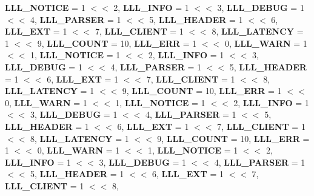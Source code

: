 \begin{DoxyCompactItemize}
{\bfseries L\+L\+L\+\_\+\+N\+O\+T\+I\+CE} = 1 $<$$<$ 2, 
{\bfseries L\+L\+L\+\_\+\+I\+N\+FO} = 1 $<$$<$ 3, 
\newline
{\bfseries L\+L\+L\+\_\+\+D\+E\+B\+UG} = 1 $<$$<$ 4, 
{\bfseries L\+L\+L\+\_\+\+P\+A\+R\+S\+ER} = 1 $<$$<$ 5, 
{\bfseries L\+L\+L\+\_\+\+H\+E\+A\+D\+ER} = 1 $<$$<$ 6, 
{\bfseries L\+L\+L\+\_\+\+E\+XT} = 1 $<$$<$ 7, 
\newline
{\bfseries L\+L\+L\+\_\+\+C\+L\+I\+E\+NT} = 1 $<$$<$ 8, 
{\bfseries L\+L\+L\+\_\+\+L\+A\+T\+E\+N\+CY} = 1 $<$$<$ 9, 
{\bfseries L\+L\+L\+\_\+\+C\+O\+U\+NT} = 10, 
{\bfseries L\+L\+L\+\_\+\+E\+RR} = 1 $<$$<$ 0, 
\newline
{\bfseries L\+L\+L\+\_\+\+W\+A\+RN} = 1 $<$$<$ 1, 
{\bfseries L\+L\+L\+\_\+\+N\+O\+T\+I\+CE} = 1 $<$$<$ 2, 
{\bfseries L\+L\+L\+\_\+\+I\+N\+FO} = 1 $<$$<$ 3, 
{\bfseries L\+L\+L\+\_\+\+D\+E\+B\+UG} = 1 $<$$<$ 4, 
\newline
{\bfseries L\+L\+L\+\_\+\+P\+A\+R\+S\+ER} = 1 $<$$<$ 5, 
{\bfseries L\+L\+L\+\_\+\+H\+E\+A\+D\+ER} = 1 $<$$<$ 6, 
{\bfseries L\+L\+L\+\_\+\+E\+XT} = 1 $<$$<$ 7, 
{\bfseries L\+L\+L\+\_\+\+C\+L\+I\+E\+NT} = 1 $<$$<$ 8, 
\newline
{\bfseries L\+L\+L\+\_\+\+L\+A\+T\+E\+N\+CY} = 1 $<$$<$ 9, 
{\bfseries L\+L\+L\+\_\+\+C\+O\+U\+NT} = 10, 
{\bfseries L\+L\+L\+\_\+\+E\+RR} = 1 $<$$<$ 0, 
{\bfseries L\+L\+L\+\_\+\+W\+A\+RN} = 1 $<$$<$ 1, 
\newline
{\bfseries L\+L\+L\+\_\+\+N\+O\+T\+I\+CE} = 1 $<$$<$ 2, 
{\bfseries L\+L\+L\+\_\+\+I\+N\+FO} = 1 $<$$<$ 3, 
{\bfseries L\+L\+L\+\_\+\+D\+E\+B\+UG} = 1 $<$$<$ 4, 
{\bfseries L\+L\+L\+\_\+\+P\+A\+R\+S\+ER} = 1 $<$$<$ 5, 
\newline
{\bfseries L\+L\+L\+\_\+\+H\+E\+A\+D\+ER} = 1 $<$$<$ 6, 
{\bfseries L\+L\+L\+\_\+\+E\+XT} = 1 $<$$<$ 7, 
{\bfseries L\+L\+L\+\_\+\+C\+L\+I\+E\+NT} = 1 $<$$<$ 8, 
{\bfseries L\+L\+L\+\_\+\+L\+A\+T\+E\+N\+CY} = 1 $<$$<$ 9, 
\newline
{\bfseries L\+L\+L\+\_\+\+C\+O\+U\+NT} = 10, 
{\bfseries L\+L\+L\+\_\+\+E\+RR} = 1 $<$$<$ 0, 
{\bfseries L\+L\+L\+\_\+\+W\+A\+RN} = 1 $<$$<$ 1, 
{\bfseries L\+L\+L\+\_\+\+N\+O\+T\+I\+CE} = 1 $<$$<$ 2, 
\newline
{\bfseries L\+L\+L\+\_\+\+I\+N\+FO} = 1 $<$$<$ 3, 
{\bfseries L\+L\+L\+\_\+\+D\+E\+B\+UG} = 1 $<$$<$ 4, 
{\bfseries L\+L\+L\+\_\+\+P\+A\+R\+S\+ER} = 1 $<$$<$ 5, 
{\bfseries L\+L\+L\+\_\+\+H\+E\+A\+D\+ER} = 1 $<$$<$ 6, 
\newline
{\bfseries L\+L\+L\+\_\+\+E\+XT} = 1 $<$$<$ 7, 
{\bfseries L\+L\+L\+\_\+\+C\+L\+I\+E\+NT} = 1 $<$$<$ 8, 
$$
\end{DoxyCompactItemize}
